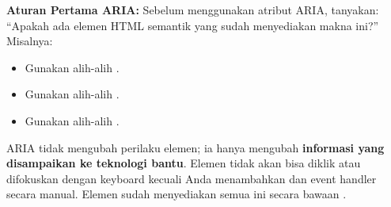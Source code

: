 \begin{konsep}
\textbf{Aturan Pertama ARIA:} Sebelum menggunakan atribut ARIA, tanyakan: ``Apakah ada elemen HTML semantik yang sudah menyediakan makna ini?'' Misalnya:
\begin{itemize}
  \item Gunakan  alih-alih .
  \item Gunakan  alih-alih .
  \item Gunakan  alih-alih .
\end{itemize}
ARIA tidak mengubah perilaku elemen; ia hanya mengubah \textbf{informasi yang disampaikan ke teknologi bantu}. Elemen  tidak akan bisa diklik atau difokuskan dengan keyboard kecuali Anda menambahkan  dan event handler secara manual. Elemen  sudah menyediakan semua ini secara bawaan \cite{webdevAccessibility}.
\end{konsep}

